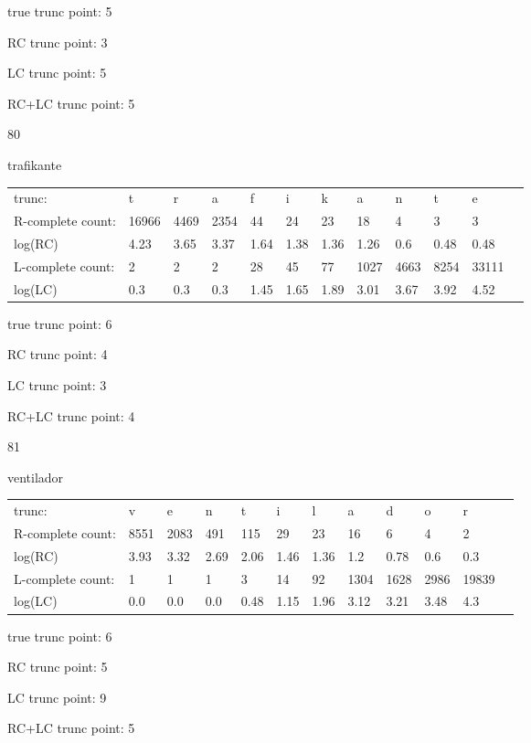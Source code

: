 \documentclass{article}
\begin{document}
true trunc point: 5

RC trunc point: 3

LC trunc point: 5

RC+LC trunc point: 5

\vspace{1em}

80

trafikante

\begin{tabular}{l|lllllllllll}
trunc: & t & r & a & f & i & k & a & n & t & e & \\ 
R-complete count: & 16966 & 4469 & 2354 & 44 & 24 & 23 & 18 & 4 & 3 & 3 & \\ 
log(RC) & 4.23 & 3.65 & 3.37 & 1.64 & 1.38 & 1.36 & 1.26 & 0.6 & 0.48 & 0.48 & \\ 
L-complete count: & 2 & 2 & 2 & 28 & 45 & 77 & 1027 & 4663 & 8254 & 33111 & \\ 
log(LC) & 0.3 & 0.3 & 0.3 & 1.45 & 1.65 & 1.89 & 3.01 & 3.67 & 3.92 & 4.52 & \\ 
\end{tabular}

true trunc point: 6

RC trunc point: 4

LC trunc point: 3

RC+LC trunc point: 4

\newpage

81

ventilador

\begin{tabular}{l|lllllllllll}
trunc: & v & e & n & t & i & l & a & d & o & r & \\ 
R-complete count: & 8551 & 2083 & 491 & 115 & 29 & 23 & 16 & 6 & 4 & 2 & \\ 
log(RC) & 3.93 & 3.32 & 2.69 & 2.06 & 1.46 & 1.36 & 1.2 & 0.78 & 0.6 & 0.3 & \\ 
L-complete count: & 1 & 1 & 1 & 3 & 14 & 92 & 1304 & 1628 & 2986 & 19839 & \\ 
log(LC) & 0.0 & 0.0 & 0.0 & 0.48 & 1.15 & 1.96 & 3.12 & 3.21 & 3.48 & 4.3 & \\ 
\end{tabular}

true trunc point: 6

RC trunc point: 5

LC trunc point: 9

RC+LC trunc point: 5

\vspace{1em}
\end{document}
